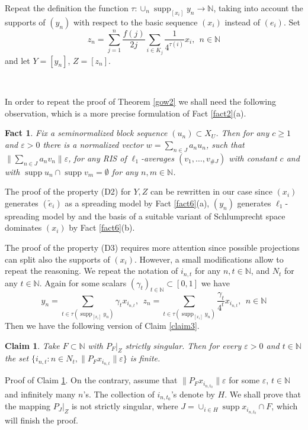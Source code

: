 \documentclass{amsart}
\newtheorem{fact}[theorem]{Fact}
\newtheorem{claim}{Claim}
\numberwithin{subsection}{section}
\numberwithin{equation}{section}
\begin{document}
Repeat the definition the function $\tau:\cup_n\operatorname{supp}_{[x_i]} y_n\to {{\mathbb{N}}}$, taking into account the supports of $(y_n)$ with respect to the basic sequence $(x_i)$ instead of $(e_i)$. Set
$$
z_{n}=\sum_{j=1}^n\frac{f(j)}{2j}\sum_{i\in K_j}\frac{1}{4^{\tau(i)}}x_i, \ \ n\in{{\mathbb{N}}}
$$
and let $Y=[y_{n}]$, $Z=[z_{n}]$.

\

In order to repeat the proof of Theorem \ref{gow2} we shall need the following observation, which is a more precise formulation of Fact \ref{fact2}(a).
\begin{fact}\label{fact7} 
Fix a seminormalized block sequence $(u_n)\subset X_U$. Then for any  $c\geq 1$ and ${\varepsilon}>0$ there is a normalized vector $w=\sum_{n\in J}a_nu_n$, such that ${\lVert \sum_{n\in J}a_nv_n\rVert}{\varepsilon}$, for any RIS of $\ell_1$-averages $(v_1,\dots,v_{\#J})$ with constant $c$ and with $\operatorname{supp} u_n\cap \operatorname{supp} v_m=\emptyset$ for any $n,m\in{{\mathbb{N}}}$. 
\end{fact}
The proof of the property (D2) for $Y,Z$ can be rewritten in our case since $(x_i)$ generates $(\tilde{e}_i)$ as a spreading model by Fact \ref{fact6}(a), $(y_n)$ generates $\ell_1$-spreading model by \cite{KL} and the basis of a suitable variant of Schlumprecht space dominates $(x_i)$ by Fact \ref{fact6}(b). 

The proof of the property (D3) requires more attention since possible projections can split also the supports of $(x_i)$. However, a small modifications allow to repeat the reasoning. We repeat the notation of $i_{n,t}$ for any $n,t\in{{\mathbb{N}}}$, and $N_t$ for any $t\in{{\mathbb{N}}}$. Again for some  scalars $(\gamma_t)_{t\in{{\mathbb{N}}}}\subset [0,1]$ we have 
$$
y_n=\sum_{t\in \tau(\operatorname{supp}_{[x_i]}y_n)}\gamma_tx_{i_{n,t}}, \ \ z_n=\sum_{t\in \tau(\operatorname{supp}_{[x_i]}y_n)}\frac{\gamma_t}{4^t}x_{i_{n,t}}, \ \ n\in{{\mathbb{N}}}
$$ 
Then we have the following version of Claim \ref{claim3}.
\begin{claim}\label{claim5}
Take $F\subset{{\mathbb{N}}}$ with $P_{F}|_{Z}$ strictly singular.  Then for every ${\varepsilon}>0$ and $t\in{{\mathbb{N}}}$ the set $\{i_{n,t}: n\in N_t, {\lVert P_{F}x_{i_{n,t}}\rVert}{\varepsilon}\}$ is finite.
\end{claim}
Proof of Claim \ref{claim5}. On the contrary, assume that ${\lVert P_{F}x_{i_{n,t_0}}\rVert} {\varepsilon}$ for some ${\varepsilon}$, $t\in{{\mathbb{N}}}$ and infinitely many $n$'s. The collection of $i_{n,t_0}$'s denote by $H$. We shall prove that the mapping $P_J|_Z$ is not strictly singular, where $J=\cup_{i\in H}\operatorname{supp} x_{i_{n,t_0}}\cap F$, which will finish the proof. 
\end{document}
